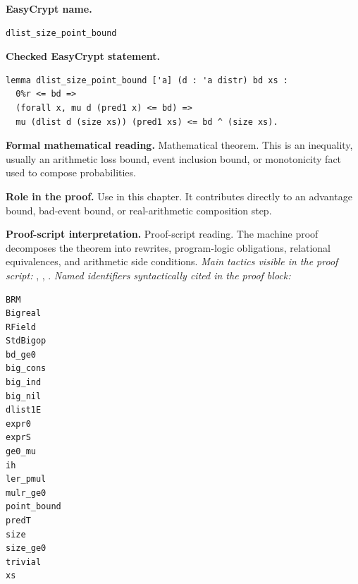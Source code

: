 \begin{formaltheorem}
\noindent\textbf{EasyCrypt name.}
\begin{lstlisting}[language=EasyCrypt,basicstyle=\ttfamily\scriptsize]
dlist_size_point_bound
\end{lstlisting}
\noindent\textbf{Checked EasyCrypt statement.}
\begin{lstlisting}[language=EasyCrypt,basicstyle=\ttfamily\scriptsize]
lemma dlist_size_point_bound ['a] (d : 'a distr) bd xs :
  0%r <= bd =>
  (forall x, mu d (pred1 x) <= bd) =>
  mu (dlist d (size xs)) (pred1 xs) <= bd ^ (size xs).
\end{lstlisting}
\noindent\textbf{Formal mathematical reading.}
Mathematical theorem. This is an inequality, usually an arithmetic loss bound, event inclusion bound, or monotonicity fact used to compose probabilities.

\noindent\textbf{Role in the proof.}
Use in this chapter. It contributes directly to an advantage bound, bad-event bound, or real-arithmetic composition step.

\noindent\textbf{Proof-script interpretation.}
Proof-script reading. The machine proof decomposes the theorem into rewrites, program-logic obligations, relational equivalences, and arithmetic side conditions.
\emph{Main tactics visible in the proof script:} , , .
\emph{Named identifiers syntactically cited in the proof block:}
\begin{lstlisting}[language=EasyCrypt,basicstyle=\ttfamily\scriptsize]
BRM
Bigreal
RField
StdBigop
bd_ge0
big_cons
big_ind
big_nil
dlist1E
expr0
exprS
ge0_mu
ih
ler_pmul
mulr_ge0
point_bound
predT
size
size_ge0
trivial
xs
\end{lstlisting}

\end{formaltheorem}

